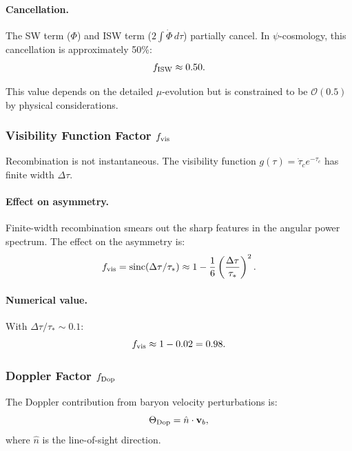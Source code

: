 \paragraph{Cancellation.}
The SW term ($\Phi$) and ISW term ($2\int\dot{\Phi}\,d\tau$) partially cancel. In $\psi$-cosmology, this cancellation is approximately 50\%:
\begin{equation}
f_{\rm ISW} \approx 0.50.
\end{equation}

This value depends on the detailed $\mu$-evolution but is constrained to be $\mathcal{O}(0.5)$ by physical considerations.

\subsubsection{Visibility Function Factor $f_{\rm vis}$}

Recombination is not instantaneous. The visibility function $g(\tau) = \dot{\tau}_c e^{-\tau_c}$ has finite width $\Delta\tau$.

\paragraph{Effect on asymmetry.}
Finite-width recombination smears out the sharp features in the angular power spectrum. The effect on the asymmetry is:
\begin{equation}
f_{\rm vis} = \text{sinc}(\Delta\tau/\tau_*) \approx 1 - \frac{1}{6}\left(\frac{\Delta\tau}{\tau_*}\right)^2.
\end{equation}

\paragraph{Numerical value.}
With $\Delta\tau/\tau_* \sim 0.1$:
\begin{equation}
f_{\rm vis} \approx 1 - 0.02 = 0.98.
\end{equation}

\subsubsection{Doppler Factor $f_{\rm Dop}$}

The Doppler contribution from baryon velocity perturbations is:
\begin{equation}
\Theta_{\rm Dop} = \hat{n} \cdot \mathbf{v}_b,
\end{equation}
where $\hat{n}$ is the line-of-sight direction.

